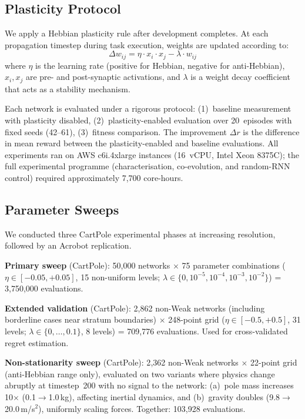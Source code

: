 \documentclass[sigconf,nonacm]{acmart}
\begin{document}
\subsection{Plasticity Protocol}

We apply a Hebbian plasticity rule after development completes. At each propagation timestep during task execution, weights are updated according to:
\begin{equation}
  \Delta w_{ij} = \eta \cdot x_i \cdot x_j - \lambda \cdot w_{ij}
  \label{eq:hebb}
\end{equation}
where $\eta$ is the learning rate (positive for Hebbian, negative for anti-Hebbian), $x_i, x_j$ are pre- and post-synaptic activations, and $\lambda$ is a weight decay coefficient that acts as a stability mechanism.

Each network is evaluated under a rigorous protocol: (1)~baseline measurement with plasticity disabled, (2)~plasticity-enabled evaluation over 20~episodes with fixed seeds (42--61), (3)~fitness comparison. The improvement $\Delta r$ is the difference in mean reward between the plasticity-enabled and baseline evaluations. All experiments ran on AWS c6i.4xlarge instances (16~vCPU, Intel Xeon 8375C); the full experimental programme (characterisation, co-evolution, and random-RNN control) required approximately 7{,}700 core-hours.

\subsection{Parameter Sweeps}

We conducted three CartPole experimental phases at increasing resolution, followed by an Acrobot replication.

\textbf{Primary sweep} (CartPole): 50{,}000 networks $\times$ 75 parameter combinations ($\eta \in [-0.05, +0.05]$, 15 non-uniform levels; $\lambda \in \{0, 10^{-5}, 10^{-4}, 10^{-3}, 10^{-2}\}$) = 3{,}750{,}000 evaluations.

\textbf{Extended validation} (CartPole): 2{,}862 non-Weak networks (including borderline cases near stratum boundaries) $\times$ 248-point grid ($\eta \in [-0.5, +0.5]$, 31 levels; $\lambda \in \{0, \ldots, 0.1\}$, 8 levels) = 709{,}776 evaluations. Used for cross-validated regret estimation.

\textbf{Non-stationarity sweep} (CartPole): 2{,}362 non-Weak networks $\times$ 22-point grid (anti-Hebbian range only), evaluated on two variants where physics change abruptly at timestep~200 with no signal to the network: (a)~pole mass increases 10$\times$ (0.1$\to$1.0\,kg), affecting inertial dynamics, and (b)~gravity doubles (9.8$\to$20.0\,m/s$^2$), uniformly scaling forces. Together: 103{,}928 evaluations.
\end{document}
